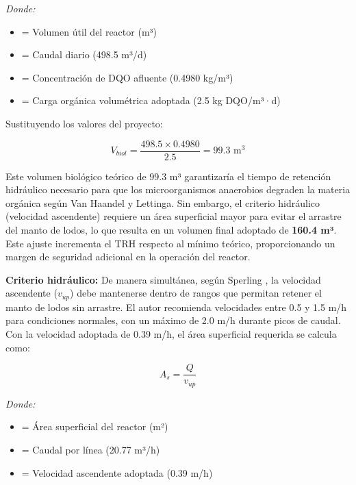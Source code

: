 \documentclass[12pt,a4paper]{article}
\begin{document}
\textit{Donde:}
\begin{itemize}[noitemsep,leftmargin=2em]
    \item[$V_r$] = Volumen útil del reactor (m³)
    \item[$Q$] = Caudal diario (498.5 m³/d)
    \item[$S_0$] = Concentración de DQO afluente (0.4980 kg/m³)
    \item[$C_v$] = Carga orgánica volumétrica adoptada (2.5 kg DQO/m³·d)
\end{itemize}

Sustituyendo los valores del proyecto:

\begin{equation}
V_{biol} = \frac{498.5 \times 0.4980}{2.5} = 99.3 \text{ m}^3
\end{equation}

Este volumen biológico teórico de 99.3 m³ garantizaría el tiempo de retención hidráulico necesario para que los microorganismos anaerobios degraden la materia orgánica según Van Haandel y Lettinga. Sin embargo, el criterio hidráulico (velocidad ascendente) requiere un área superficial mayor para evitar el arrastre del manto de lodos, lo que resulta en un volumen final adoptado de \textbf{160.4 m³}. Este ajuste incrementa el TRH respecto al mínimo teórico, proporcionando un margen de seguridad adicional en la operación del reactor.

\textbf{Criterio hidráulico:} De manera simultánea, según Sperling \cite{sperling2007}, la velocidad ascendente ($v_{up}$) debe mantenerse dentro de rangos que permitan retener el manto de lodos sin arrastre. El autor recomienda velocidades entre 0.5 y 1.5 m/h para condiciones normales, con un máximo de 2.0 m/h durante picos de caudal. Con la velocidad adoptada de 0.39 m/h, el área superficial requerida se calcula como:

\begin{equation}
A_s = \frac{Q}{v_{up}}
\end{equation}

\textit{Donde:}
\begin{itemize}[noitemsep,leftmargin=2em]
    \item[$A_s$] = Área superficial del reactor (m²)
    \item[$Q$] = Caudal por línea (20.77 m³/h)
    \item[$v_{up}$] = Velocidad ascendente adoptada (0.39 m/h)
\end{itemize}
\end{document}
